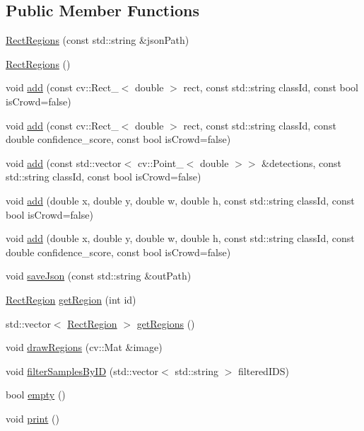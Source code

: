 \subsection*{Public Member Functions}
\begin{DoxyCompactItemize}
\item 
\hyperlink{struct_rect_regions_a75fc4850d7b8caee61164658e47832fb}{Rect\+Regions} (const std\+::string \&json\+Path)
\item 
\hyperlink{struct_rect_regions_af0c705b56314b41a80970fcd826b0600}{Rect\+Regions} ()
\item 
void \hyperlink{struct_rect_regions_a949e327f668e731868a853b6331761be}{add} (const cv\+::\+Rect\+\_\+$<$ double $>$ rect, const std\+::string class\+Id, const bool is\+Crowd=false)
\item 
void \hyperlink{struct_rect_regions_afebb1d6079ae2d0701b70c3c153a4a88}{add} (const cv\+::\+Rect\+\_\+$<$ double $>$ rect, const std\+::string class\+Id, const double confidence\+\_\+score, const bool is\+Crowd=false)
\item 
void \hyperlink{struct_rect_regions_a00afed1e298d77dd9dd722e590507586}{add} (const std\+::vector$<$ cv\+::\+Point\+\_\+$<$ double $>$$>$ \&detections, const std\+::string class\+Id, const bool is\+Crowd=false)
\item 
void \hyperlink{struct_rect_regions_a988c804d33f2b8fc9dabe79c3259b267}{add} (double x, double y, double w, double h, const std\+::string class\+Id, const bool is\+Crowd=false)
\item 
void \hyperlink{struct_rect_regions_a009ff3de6ffc9c05e0cd3c87916d16be}{add} (double x, double y, double w, double h, const std\+::string class\+Id, const double confidence\+\_\+score, const bool is\+Crowd=false)
\item 
void \hyperlink{struct_rect_regions_a84d6d3a2e3ee8faf775c69fcd3207767}{save\+Json} (const std\+::string \&out\+Path)
\item 
\hyperlink{struct_rect_region}{Rect\+Region} \hyperlink{struct_rect_regions_a4bbad55e0b6f3a8ece1d76402f16bfc2}{get\+Region} (int id)
\item 
std\+::vector$<$ \hyperlink{struct_rect_region}{Rect\+Region} $>$ \hyperlink{struct_rect_regions_ab1d9ba6a6a0087fd2db278a22162c63a}{get\+Regions} ()
\item 
void \hyperlink{struct_rect_regions_a9f31dc6fd3d371417e2c9024d1fdeecb}{draw\+Regions} (cv\+::\+Mat \&image)
\item 
void \hyperlink{struct_rect_regions_a8eff732b9c2308dae4e0ff45f147cb51}{filter\+Samples\+By\+ID} (std\+::vector$<$ std\+::string $>$ filtered\+I\+DS)
\item 
bool \hyperlink{struct_rect_regions_a4ec356e30d899d9a49fce3fe95f73d34}{empty} ()
\item 
void \hyperlink{struct_rect_regions_a6ce45dd2b9d9f0f3424d4c6d656652c2}{print} ()
\end{DoxyCompactItemize}
